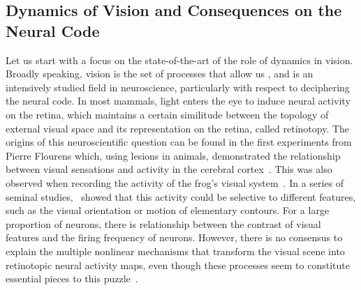 \documentclass[brainsci, %
               review,accept,pdftex,moreauthors
               ]{Definitions/mdpi}
\begin{document}
\subsection{Dynamics of Vision and Consequences on the Neural Code}%
%
Let us start with a focus on the state-of-the-art of the role of dynamics in vision. Broadly speaking, vision is the set of processes that allow us , and is an intensively studied field in neuroscience, particularly with respect to deciphering the neural code. In most mammals, light enters the eye to induce neural activity on the retina, which maintains a certain similitude between the topology of external visual space and its representation on the retina, called retinotopy. The origins of this neuroscientific question can be found in the first experiments from Pierre Flourens which, using lesions in animals, demonstrated the relationship between visual sensations and activity in the cerebral cortex~\citep{flourens_recherches_1842,pearce_marie-jean-pierre_2009}. This was also observed  when recording the activity of the frog's visual system~\citep{adrian_impulses_1926}. In a series of seminal studies,~\citet{hubel_receptive_1968} showed that this activity could be selective to different features, such as the visual orientation or motion of elementary contours. For a large proportion of neurons, there is  relationship between the contrast of visual features and the firing frequency of neurons. However, there is no consensus to explain the multiple nonlinear mechanisms that transform the visual scene into retinotopic neural activity maps, even though these processes seem to constitute essential pieces to this puzzle~\citep{carandini_normalization_2012}. 

\end{document}
